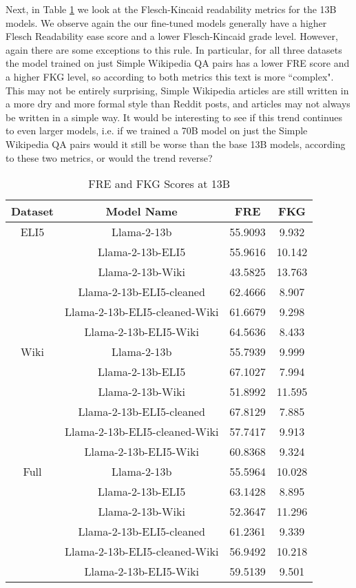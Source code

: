 \documentclass[11pt, oneside]{article}   	%
\begin{document}
Next, in Table \ref{tab:FRE_FKG_13B} we look at the Flesch-Kincaid readability metrics for the 13B models. 
We observe again the our fine-tuned models generally have a higher Flesch Readability ease score and a lower Flesch-Kincaid grade level.
However, again there are some exceptions to this rule.
In particular, for all three datasets the model trained on just Simple Wikipedia QA pairs has a lower FRE score and a higher FKG level, so according to both metrics this text is more ``complex".
This may not be entirely surprising, Simple Wikipedia articles are still written in a more dry and more formal style than Reddit posts, and articles may not always be written in a simple way. 
It would be interesting to see if this trend continues to even larger models, i.e. if we trained a 70B model on just the Simple Wikipedia QA pairs would it still be worse than the base 13B models, according to these two metrics, or would the trend reverse?



\begin{table}[h]
\centering
\begin{tabular}{cccc}
\toprule
Dataset & Model Name & FRE & FKG \\
\midrule
ELI5 & Llama-2-13b & 55.9093 & 9.932 \\
 & Llama-2-13b-ELI5 & 55.9616 & 10.142 \\
 & Llama-2-13b-Wiki & 43.5825 & 13.763 \\
 & Llama-2-13b-ELI5-cleaned & 62.4666 & 8.907 \\
 & Llama-2-13b-ELI5-cleaned-Wiki & 61.6679 & 9.298 \\
 & Llama-2-13b-ELI5-Wiki & 64.5636 & 8.433 \\
\midrule
Wiki & Llama-2-13b & 55.7939 & 9.999 \\
 & Llama-2-13b-ELI5 & 67.1027 & 7.994 \\
 & Llama-2-13b-Wiki & 51.8992 & 11.595 \\
 & Llama-2-13b-ELI5-cleaned & 67.8129 & 7.885 \\
 & Llama-2-13b-ELI5-cleaned-Wiki & 57.7417 & 9.913 \\
 & Llama-2-13b-ELI5-Wiki & 60.8368 & 9.324 \\
 \midrule
Full & Llama-2-13b & 55.5964 & 10.028 \\
 & Llama-2-13b-ELI5 & 63.1428 & 8.895 \\
 & Llama-2-13b-Wiki & 52.3647 & 11.296 \\
 & Llama-2-13b-ELI5-cleaned & 61.2361 & 9.339 \\
 & Llama-2-13b-ELI5-cleaned-Wiki & 56.9492 & 10.218 \\
 & Llama-2-13b-ELI5-Wiki & 59.5139 & 9.501 \\
\bottomrule
\end{tabular}
\caption{FRE and FKG Scores at 13B}
\label{tab:FRE_FKG_13B}
\end{table}
\end{document}
